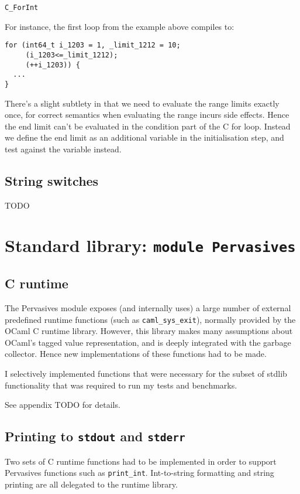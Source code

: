 \documentclass[12pt,a4paper,twoside,openright]{report}
\begin{document}
\lstinline!C_ForInt!

For instance, the first loop from the example above
compiles to:

\begin{lstlisting}
for (int64_t i_1203 = 1, _limit_1212 = 10;
     (i_1203<=_limit_1212);
     (++i_1203)) {
  ...
}
\end{lstlisting}

There's a slight subtlety in that we need to evaluate the range limits exactly
once, for correct semantics when evaluating the range incurs side effects.
Hence the end limit can't be evaluated in the condition part of the C for loop.
Instead we define the end limit as an additional variable in the initialisation
step, and test against the variable instead.

\subsection{String switches}\label{stringswitch}

TODO

\section{Standard library: \texttt{module Pervasives}}

\subsection{C runtime}

The Pervasives module exposes (and internally uses) a large number of external
predefined runtime functions (such as \lstinline!caml_sys_exit!), normally
provided by the OCaml C runtime library. However, this library makes many
assumptions about OCaml's tagged value representation, and is deeply integrated
with the garbage collector. Hence new implementations of these functions had to
be made.

I selectively implemented functions that were necessary for the subset of
stdlib functionality that was required to run my tests and benchmarks.

See appendix TODO for details.

\subsection{Printing to \texttt{stdout} and \texttt{stderr}}\label{pervasives-printing}

Two sets of C runtime functions had to be implemented in order to support
Pervasives functions such as \lstinline!print_int!. Int-to-string formatting
and string printing are all delegated to the runtime library.
\end{document}

